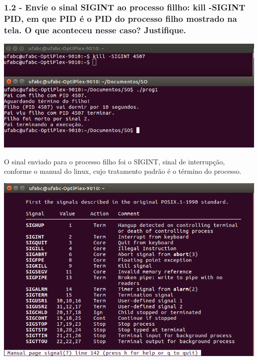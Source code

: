 \subsubsection{1.2 - Envie o sinal SIGINT ao processo ﬁllho: kill -SIGINT PID, em que PID é o PID do processo ﬁlho mostrado na tela. O que aconteceu nesse caso? Justiﬁque.}

\vspace{2em}
\begin{minipage}{\textwidth}
    \hspace{-1em}
    \centering
    \includegraphics[scale=.4]{pratica1/prog1kill.png}
    \label{prog1killpng}
    \hspace{1em}
\end{minipage}
\vspace{0.5em}

O sinal enviado para o processo filho foi o SIGINT, sinal de interrupção, conforme o manual do linux, cujo tratamento padrão é o término do processo.

\vspace{2em}
\begin{minipage}{\textwidth}
    \hspace{-1em}
    \centering
    \includegraphics[scale=.4]{pratica1/signals.png}
    \label{signals}
    \hspace{1em}
\end{minipage}
\vspace{0.5em}

